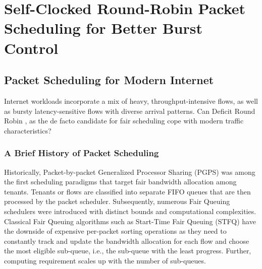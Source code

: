 \chapter{Self-Clocked Round-Robin Packet Scheduling for Better Burst Control} \label{chap:chap-3}






\section{Packet Scheduling for Modern Internet}
\label{sec:scrr-background}

Internet workloads incorporate a mix of heavy, throughput-intensive flows, as well as bursty latency-sensitive flows with diverse arrival patterns. Can Deficit Round Robin \cite{drr}, as the de facto candidate for fair scheduling cope with modern traffic characteristics?



\subsection{A Brief History of Packet Scheduling}
\label{sec:schedulers}

Historically, Packet-by-packet Generalized Processor Sharing (PGPS) \cite{gps} was among the first scheduling paradigms that target fair bandwidth allocation among tenants. Tenants or flows are classified into separate FIFO queues that are then processed by the packet scheduler. Subsequently, numerous Fair Queuing schedulers \cite{sparrow,scfq,stfq,frr,drr,mqfq,wfq} were introduced with distinct bounds and computational complexities. 
Classical Fair Queuing algorithms such as Start-Time Fair Queuing (STFQ) \cite{stfq} have the downside of expensive per-packet sorting operations as they need to constantly track and update the bandwidth allocation for each flow and choose the most eligible sub-queue, i.e., the sub-queue with the least progress. Further, computing requirement scales up with the number of sub-queues.

